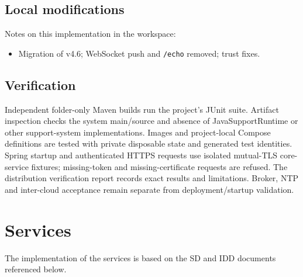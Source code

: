 \documentclass[a4paper]{arrowhead}
\begin{document}
\subsection{Local modifications}
\label{sec:local}

Notes on this implementation in the workspace:
\begin{itemize}
  \item Migration of v4.6; WebSocket push and \texttt{/\allowbreak{}echo} removed; trust fixes.
\end{itemize}

\subsection{Verification}

Independent folder-only Maven builds run the project's JUnit suite. Artifact inspection checks the system main/source and absence of JavaSupportRuntime or other support-system implementations. Images and project-local Compose definitions are tested with private disposable state and generated test identities. Spring startup and authenticated HTTPS requests use isolated mutual-TLS core-service fixtures; missing-token and missing-certificate requests are refused. The distribution verification report records exact results and limitations. Broker, NTP and inter-cloud acceptance remain separate from deployment/startup validation.

\newpage

\section{Services}
\label{sec:services}

The implementation of the services is based on the SD and IDD documents referenced below.
\end{document}
